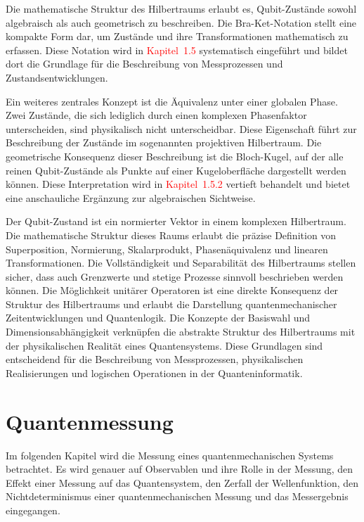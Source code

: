 Die mathematische Struktur des Hilbertraums erlaubt es, Qubit-Zustände sowohl algebraisch als auch geometrisch zu beschreiben. Die Bra-Ket-Notation stellt eine kompakte Form dar, um Zustände und ihre Transformationen mathematisch zu erfassen. Diese Notation wird in  \textcolor{red} {Kapitel~1.5} systematisch eingeführt und bildet dort die Grundlage für die Beschreibung von Messprozessen und Zustandsentwicklungen.

Ein weiteres zentrales Konzept ist die Äquivalenz unter einer globalen Phase. Zwei Zustände, die sich lediglich durch einen komplexen Phasenfaktor unterscheiden, sind physikalisch nicht unterscheidbar. Diese Eigenschaft führt zur Beschreibung der Zustände im sogenannten projektiven Hilbertraum. Die geometrische Konsequenz dieser Beschreibung ist die Bloch-Kugel, auf der alle reinen Qubit-Zustände als Punkte auf einer Kugeloberfläche dargestellt werden können. Diese Interpretation wird in \textcolor{red}{Kapitel~1.5.2} vertieft behandelt und bietet eine anschauliche Ergänzung zur algebraischen Sichtweise.


Der Qubit-Zustand ist ein normierter Vektor in einem komplexen Hilbertraum. Die mathematische Struktur dieses Raums erlaubt die präzise Definition von Superposition, Normierung, Skalarprodukt, Phasenäquivalenz und linearen Transformationen. Die Vollständigkeit und Separabilität des Hilbertraums stellen sicher, dass auch Grenzwerte und stetige Prozesse sinnvoll beschrieben werden können. Die Möglichkeit unitärer Operatoren ist eine direkte Konsequenz der Struktur des Hilbertraums und erlaubt die Darstellung quantenmechanischer Zeitentwicklungen und Quantenlogik. Die Konzepte der Basiswahl und Dimensionsabhängigkeit verknüpfen die abstrakte Struktur des Hilbertraums mit der physikalischen Realität eines Quantensystems. Diese Grundlagen sind entscheidend für die Beschreibung von Messprozessen, physikalischen Realisierungen und logischen Operationen in der Quanteninformatik.




\section{Quantenmessung }
\label{sec: Quantenmessung}
Im folgenden Kapitel wird die Messung eines quantenmechanischen Systems betrachtet. Es wird genauer auf Observablen und ihre Rolle in der Messung, den Effekt einer Messung auf das Quantensystem, den Zerfall der Wellenfunktion, den Nichtdeterminismus einer quantenmechanischen Messung und das Messergebnis eingegangen. 
